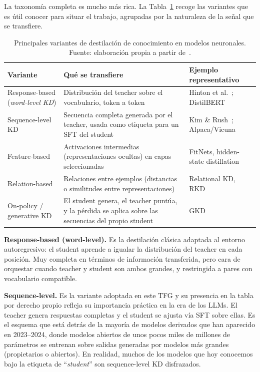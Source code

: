 La taxonomía completa es mucho más rica. La Tabla~\ref{tab:kd-variantes} recoge las variantes que es útil conocer para situar el trabajo, agrupadas por la naturaleza de la señal que se transfiere.

\begin{table}[H]
\centering
\caption{Principales variantes de destilación de conocimiento en modelos neuronales. Fuente: elaboración propia a partir de~\cite{hinton2015distilling, sanh2019distilbert, gou2021survey, agarwal2024gkd}.}
\label{tab:kd-variantes}
\footnotesize
\begin{tabularx}{\textwidth}{>{\raggedright\arraybackslash}p{3cm} >{\raggedright\arraybackslash}X >{\raggedright\arraybackslash}p{3.5cm}}
\toprule
\textbf{Variante} & \textbf{Qué se transfiere} & \textbf{Ejemplo representativo} \\
\midrule
Response-based (\textit{word-level KD}) & Distribución del teacher sobre el vocabulario, token a token & Hinton et al.~\cite{hinton2015distilling}; DistilBERT~\cite{sanh2019distilbert} \\
\addlinespace
Sequence-level KD & Secuencia completa generada por el teacher, usada como etiqueta para un SFT del student & Kim \& Rush~\cite{kim2016sequence}; Alpaca/Vicuna~\cite{taori2023alpaca} \\
\addlinespace
Feature-based & Activaciones intermedias (representaciones ocultas) en capas seleccionadas & FitNets, hidden-state distillation \\
\addlinespace
Relation-based & Relaciones entre ejemplos (distancias o similitudes entre representaciones) & Relational KD, RKD \\
\addlinespace
On-policy / generative KD & El student genera, el teacher puntúa, y la pérdida se aplica sobre las secuencias del propio student & GKD~\cite{agarwal2024gkd} \\
\bottomrule
\end{tabularx}
\end{table}

\textbf{Response-based (word-level).} Es la destilación clásica adaptada al entorno autoregresivo: el student aprende a igualar la distribución del teacher en cada posición. Muy completa en términos de información transferida, pero cara de orquestar cuando teacher y student son ambos grandes, y restringida a pares con vocabulario compatible.

\textbf{Sequence-level.} Es la variante adoptada en este TFG y su presencia en la tabla por derecho propio refleja su importancia práctica en la era de los LLMs. El teacher genera respuestas completas y el student se ajusta vía SFT sobre ellas. Es el esquema que está detrás de la mayoría de modelos derivados que han aparecido en 2023--2024, donde modelos abiertos de unos pocos miles de millones de parámetros se entrenan sobre salidas generadas por modelos más grandes (propietarios o abiertos). En realidad, muchos de los modelos que hoy conocemos bajo la etiqueta de ``\textit{student}'' son sequence-level KD disfrazados.

